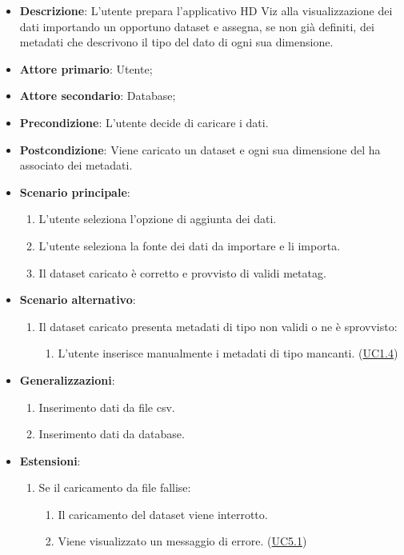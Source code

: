 \begin{itemize}
    \item \textbf{Descrizione}: L'utente prepara l'applicativo HD Viz alla visualizzazione dei dati importando un opportuno dataset e assegna, se non già definiti, dei metadati che descrivono il tipo del dato di ogni sua dimensione.
	
    \item \textbf{Attore primario}: Utente;
    \item \textbf{Attore secondario}: Database;
    
    
    \item \textbf{Precondizione}:   L'utente decide di caricare i dati.

    \item \textbf{Postcondizione}:  Viene caricato un dataset e ogni sua dimensione del ha associato
                                    dei metadati.

	\item \textbf{Scenario principale}:
		\begin{enumerate}
			\item L'utente seleziona l'opzione di aggiunta dei dati.
            \item L'utente seleziona la fonte dei dati da importare e li importa.
            \item Il dataset caricato è corretto e provvisto di validi metatag.
        \end{enumerate}
   
    \item \textbf{Scenario alternativo}:
		\begin{enumerate}
            \item Il dataset caricato presenta metadati di tipo non validi o ne è sprovvisto:
            \begin{enumerate}
                \item L'utente inserisce manualmente i metadati di tipo mancanti. (\hyperref[ssub:uc1.4]{UC1.4})
            \end{enumerate}
        \end{enumerate}

    \item \textbf{Generalizzazioni}:
    \begin{enumerate}
        \item Inserimento dati da file csv.
        \item Inserimento dati da database.
    \end{enumerate}
    
    \item \textbf{Estensioni}:
    \begin{enumerate}
        \item Se il caricamento da file fallise:
        \begin{enumerate}
            \item Il caricamento del dataset viene interrotto.
            \item Viene visualizzato un messaggio di errore. (\hyperref[ssub:uc5.1]{UC5.1})
        \end{enumerate}
    \end{enumerate}
\end{itemize}

